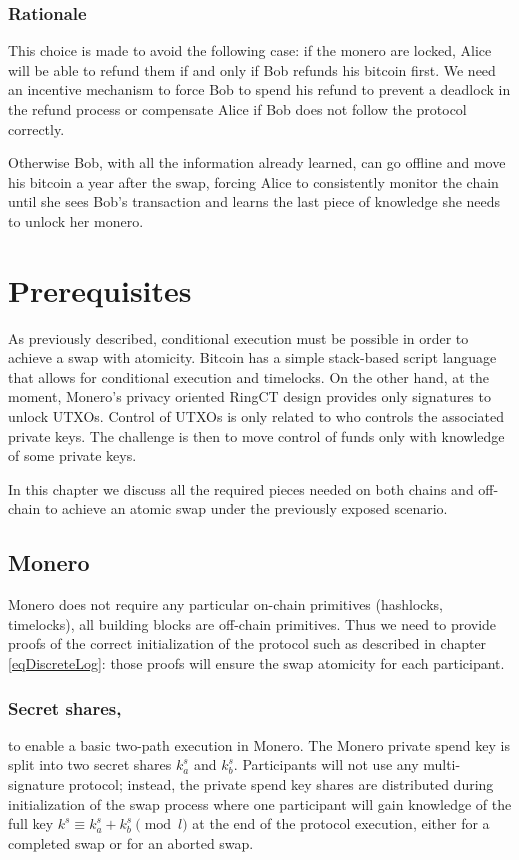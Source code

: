 \documentclass{llncs}
\begin{document}
\subsubsection{Rationale}
\label{worstCaseRationale}
This choice is made to avoid the following case: if the monero are locked, Alice will be able to refund them if and only if Bob refunds his bitcoin first. We need an incentive mechanism to force Bob to spend his refund to prevent a deadlock in the refund process or compensate Alice if Bob does not follow the protocol correctly.

Otherwise Bob, with all the information already learned, can go offline and move his bitcoin a year after the swap, forcing Alice to consistently monitor the chain until she sees Bob's transaction and learns the last piece of knowledge she needs to unlock her monero.

\section{Prerequisites}
\label{prerequisites}
As previously described, conditional execution must be possible in order to achieve a swap with atomicity. Bitcoin has a simple stack-based script language that allows for conditional execution and timelocks. On the other hand, at the moment, Monero's privacy oriented RingCT design provides only signatures to unlock UTXOs. Control of UTXOs is only related to who controls the associated private keys. The challenge is then to move control of funds only with knowledge of some private keys.

In this chapter we discuss all the required pieces needed on both chains and off-chain to achieve an atomic swap under the previously exposed scenario.

\subsection{Monero}
Monero does not require any particular on-chain primitives (hashlocks, timelocks), all building blocks are off-chain primitives. Thus we need to provide proofs of the correct initialization of the protocol such as described in chapter \ref{eqDiscreteLog}: those proofs will ensure the swap atomicity for each participant.

\subsubsection{Secret shares,}
to enable a basic two-path execution in Monero. The Monero private spend key is split into two secret shares $k^s_a$ and $k^s_b$. Participants will not use any multi-signature protocol; instead, the private spend key shares are distributed during initialization of the swap process where one participant will gain knowledge of the full key $k^s \equiv k^s_a + k^s_b \pmod l$ at the end of the protocol execution, either for a completed swap or for an aborted swap.
\end{document}
